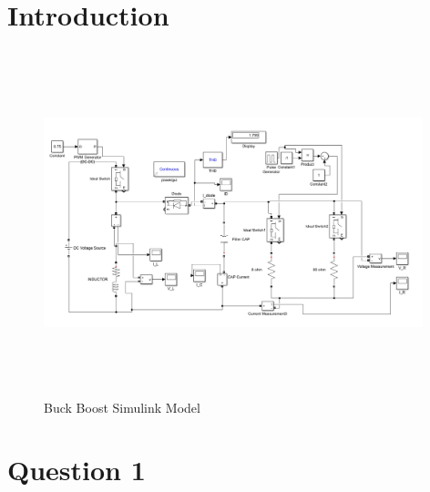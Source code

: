 \documentclass[oneside,12pt]{article}
\begin{document}
\tableofcontents
\newpage
\section{Introduction}

\begin{figure}[H]
	\centering
	\includegraphics[width=11cm, height=10cm]{"Buck Boost Simulink Model"}
	\caption{ Buck Boost Simulink Model}
	\label{fig:buck-boost-simulink-model}
\end{figure}


\section{Question 1}
\end{document}
